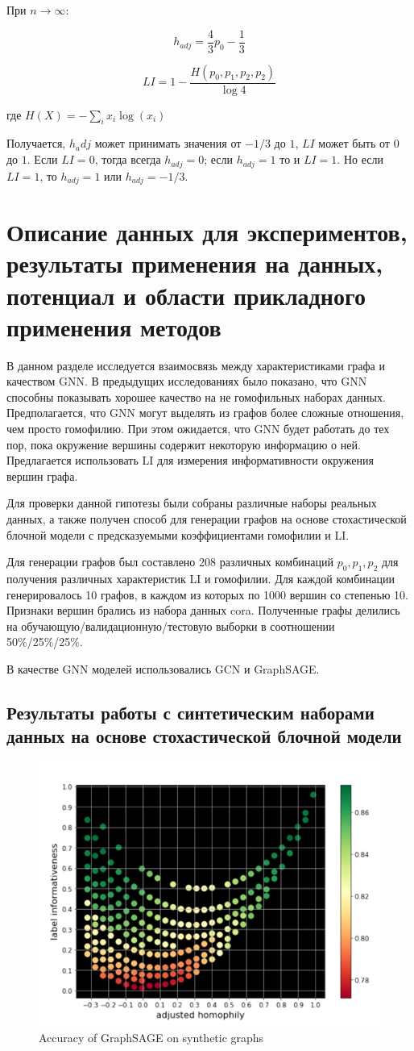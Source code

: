 \documentclass[a4paper,14pt]{article}
\begin{document}
	При $n \rightarrow \infty$:
	
	$$h_{adj} = \dfrac{4}{3}p_0 - \dfrac{1}{3}$$
	
	$$LI = 1 - \dfrac{H(p_0,p_1,p_2,p_2)}{\log 4}$$
	
	где $H(X) = -\sum_ix_i\log(x_i)$
	
	Получается, $h_adj$ может принимать значения от $-1/3$ до $1$, $LI$ может быть от $0$ до $1$. Если $LI=0$, тогда всегда $h_{adj}=0$; если $h_{adj}=1$ то и $LI=1$.
	Но если $LI=1$, то $h_{adj}=1$ или $h_{adj}=-1/3$.
	
	\pagebreak
	\section{Описание данных для экспериментов, результаты применения на данных, потенциал и области прикладного применения методов}
	\setcounter{figure}{0}
	
	В данном разделе исследуется взаимосвязь между характеристиками графа и качеством GNN.
	В предыдущих исследованиях было показано, что GNN способны показывать хорошее качество на не гомофильных наборах данных.
	Предполагается, что GNN могут выделять из графов более сложные отношения, чем просто гомофилию.
	При этом ожидается, что GNN будет работать до тех пор, пока окружение вершины содержит некоторую информацию о ней.
	Предлагается использовать LI для измерения информативности окружения вершин графа.
	
	Для проверки данной гипотезы были собраны различные наборы реальных данных, а также получен способ для генерации графов на основе стохастической блочной модели с предсказуемыми коэффициентами гомофилии и LI.
	
	Для генерации графов был составлено 208 различных комбинаций $p_0,p_1,p_2$ для получения различных характеристик LI и гомофилии.
	Для каждой комбинации генерировалось 10 графов, в каждом из которых по 1000 вершин со степенью 10. Признаки вершин брались из набора данных cora.
	Полученные графы делились на обучающую/валидационную/тестовую выборки в соотношении 50\%/25\%/25\%.
	
	В качестве GNN моделей использовались GCN и GraphSAGE.
	
	\subsection{Результаты работы с синтетическим наборами данных на основе стохастической блочной модели}


	\begin{figure}[H]
		\centering
		\includegraphics[width=0.4\linewidth]{"images/Accuracy of GraphSAGE"}
		\caption{Accuracy of GraphSAGE on synthetic graphs}
		\label{fig:accuracy-of-graphsage}
	\end{figure}
\end{document}
